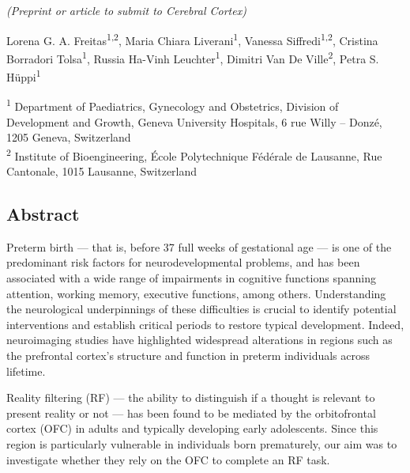 \begin{center}
 \textit{(Preprint or article to submit to Cerebral Cortex)}

Lorena G. A. Freitas\textsuperscript{1,2}, Maria Chiara Liverani\textsuperscript{1},  Vanessa Siffredi\textsuperscript{1,2}, Cristina Borradori Tolsa\textsuperscript{1}, Russia Ha-Vinh Leuchter\textsuperscript{1}, 
Dimitri Van De Ville\textsuperscript{2}, Petra S. Hüppi\textsuperscript{1}



\end{center}

\textsuperscript{1} Department of Paediatrics, Gynecology and Obstetrics, Division of Development and Growth, Geneva University Hospitals, 6 rue Willy – Donzé, 1205 Geneva, Switzerland \\
\textsuperscript{2} Institute of Bioengineering, École Polytechnique Fédérale de Lausanne, Rue Cantonale, 1015 Lausanne, Switzerland  \\



\subsection*{Abstract}
Preterm birth --- that is, before 37 full weeks of gestational age --- is one of the predominant risk factors for neurodevelopmental problems, and has been associated with a wide range of impairments in cognitive functions spanning attention, working memory, executive functions, among others. Understanding the neurological underpinnings of these difficulties is crucial to identify potential interventions and establish critical periods to restore typical development. Indeed, neuroimaging studies have highlighted widespread alterations in regions such as the prefrontal cortex's structure and function in preterm individuals across lifetime. 

Reality filtering (RF) --- the ability to distinguish if a thought is relevant to present reality or not --- has been found to be mediated by the orbitofrontal cortex (OFC) in adults and typically developing early adolescents. Since this region is particularly vulnerable in individuals born prematurely, our aim was to investigate whether they rely on the OFC to complete an RF task. 

